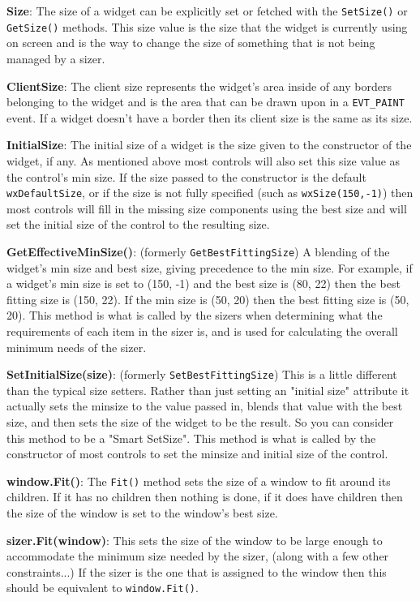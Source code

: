 {\bf Size}: The size of a widget can be explicitly set or fetched with
the \texttt{SetSize()} or \texttt{GetSize()} methods. This size value
is the size that the widget is currently using on screen and is the
way to change the size of something that is not being managed by a
sizer.

{\bf ClientSize}: The client size represents the widget's area inside
of any borders belonging to the widget and is the area that can be
drawn upon in a \texttt{EVT\_PAINT} event. If a widget doesn't have a
border then its client size is the same as its size.

{\bf InitialSize}: The initial size of a widget is the size given to
the constructor of the widget, if any.  As mentioned above most
controls will also set this size value as the control's min size. If
the size passed to the constructor is the default
\texttt{wxDefaultSize}, or if the size is not fully specified (such as
\texttt{wxSize(150,-1)}) then most controls will fill in the missing
size components using the best size and will set the initial size of
the control to the resulting size.

{\bf GetEffectiveMinSize()}: (formerly \texttt{GetBestFittingSize}) A
blending of the widget's min size and best size, giving precedence to
the min size. For example, if a widget's min size is set to (150, -1)
and the best size is (80, 22) then the best fitting size is (150,
22). If the min size is (50, 20) then the best fitting size is (50,
20). This method is what is called by the sizers when determining what
the requirements of each item in the sizer is, and is used for
calculating the overall minimum needs of the sizer.

{\bf SetInitialSize(size)}: (formerly \texttt{SetBestFittingSize})
This is a little different than the typical size setters. Rather than
just setting an "initial size" attribute it actually sets the minsize
to the value passed in, blends that value with the best size, and then
sets the size of the widget to be the result. So you can consider this
method to be a "Smart SetSize". This method is what is called by the
constructor of most controls to set the minsize and initial size of
the control.

{\bf window.Fit()}: The \texttt{Fit()} method sets the size of a
window to fit around its children. If it has no children then nothing
is done, if it does have children then the size of the window is set
to the window's best size.

{\bf sizer.Fit(window)}: This sets the size of the window to be large
enough to accommodate the minimum size needed by the sizer, (along with
a few other constraints...) If the sizer is the one that is assigned
to the window then this should be equivalent to \texttt{window.Fit()}.

